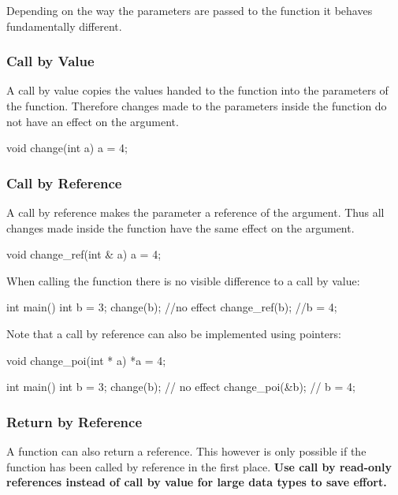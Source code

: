 \documentclass[10pt,a4paper]{scrartcl}
\begin{document}
\begin{multicols*}{2}
Depending on the way the parameters are passed to the function it behaves fundamentally different.

\subsubsection{Call by Value}

A call by value copies the values handed to the function into the parameters of the function. Therefore changes made to the parameters inside the function do not have an effect on the argument.

\begin{TPCpp}
void change(int a){
	a = 4;
}
\end{TPCpp}

\subsubsection{Call by Reference}
\label{sec:CallByReference}

A call by reference makes the parameter a reference of the argument. Thus all changes made inside the function have the same effect on the argument.

\begin{TPCpp}
void change_ref(int & a){
	a = 4;
}
\end{TPCpp}

When calling the function there is no visible difference to a call by value:

\begin{TPCpp}
int main(){
	int b = 3;
	change(b); //no effect
	change_ref(b); //b = 4;
}
\end{TPCpp}

Note that a call by reference can also be implemented using pointers:

\begin{TPCpp}
void change_poi(int * a){
	*a = 4;
}
\end{TPCpp}

\begin{TPCpp}
int main(){
	int b = 3;
	change(b); // no effect
	change_poi(&b); // b = 4;
}
\end{TPCpp}

\subsubsection{Return by Reference}

A function can also return a reference. This however is only possible if the function has been called by reference in the first place. \textbf{Use call by read-only references instead of call by value for large data types to save effort.}


\end{multicols*}
\end{document}
